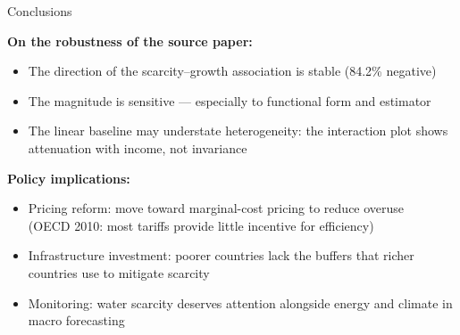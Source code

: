 \documentclass[aspectratio=169,12pt]{beamer}
\begin{document}
\begin{frame}{Conclusions}

\textbf{On the robustness of the source paper:}
\begin{itemize}
    \item The \alert{direction} of the scarcity--growth association is stable (84.2\% negative)
    \item The \alert{magnitude} is sensitive --- especially to functional form and estimator
    \item The linear baseline may understate heterogeneity: the interaction plot shows attenuation with income, not invariance
\end{itemize}

\vspace{0.3cm}
\textbf{Policy implications:}
\begin{itemize}
    \item Pricing reform: move toward marginal-cost pricing to reduce overuse\\{\footnotesize(OECD 2010: most tariffs provide little incentive for efficiency)}
    \item Infrastructure investment: poorer countries lack the buffers that richer countries use to mitigate scarcity
    \item Monitoring: water scarcity deserves attention alongside energy and climate in macro forecasting
\end{itemize}

\end{frame}
\end{document}
